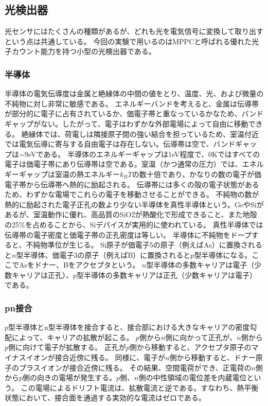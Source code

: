 \subsection{光検出器}
光センサにはたくさんの種類があるが、どれも光を電気信号に変換して取り出すという点は共通している。
今回の実験で用いるのはMPPCと呼ばれる優れた光子カウント能力を持つ小型の光検出器である。

\subsubsection{半導体}
半導体の電気伝導度は金属と絶縁体の中間の値をとり、温度、光、および微量の不純物に対し非常に敏感である。
エネルギーバンドを考えると、金属は伝導帯が部分的に電子に占有されているか、価電子帯と重なっているかなため、バンドギャップがない。したがって、電子はわずかな外部電場によって自由に移動できる。
絶縁体では、荷電しは隣接原子間の強い結合を担っているため、室温付近では電気伝導に寄与する自由電子は存在しない。伝導帯は空で、バンドギャップは$\sim9$eVである。
半導体のエネルギーギャップは1eV程度で、0Kではすべての電子は価電子帯にあり伝導帯は空である。室温（かつ通常の圧力）では、エネルギーギャップは室温の熱エネルギー$k_BT$の数十倍であり、かなりの数の電子が価電子帯から伝導帯へ熱的に励起される。
伝導帯には多くの殻の電子状態があるため、わずかな電場でこれらの電子を移動させることができる。
不純物の数が熱的に励起された電子正孔の数より少ない半導体を真性半導体という。GeやSiがあるが、室温動作に優れ、高品質のSiO2が熱酸化で形成できること、また地殻の25\%を占めることから、Siデバイスが実用的に使われている。
真性半導体では伝導帯の電子密度と価電子帯の正孔密度は等しい。
半導体に不純物をドープすると、不純物準位が生じる。
Si原子が価電子5の原子（例えばAs）に置換されると$n$型半導体、価電子3の原子（例えばB）に置換されると$p$型半導体になる。ここでAsをドナー、Bをアクセプタという。
$n$型半導体の多数キャリアは電子（少数キャリアは正孔）、$p$型半導体の多数キャリアは正孔（少数キャリアは電子）である。

\subsubsection{pn接合}
$p$型半導体とn型半導体を接合すると、接合部における大きなキャリアの密度勾配によって、キャリアの拡散が起こる。
$p$側から$n$側に向かって正孔が、$n$側から$p$側に向けて電子が拡散する。
正孔が$p$側から移動すると、アクセプタ原子のマイナスイオンが接合近傍に残る。
同様に、電子が$n$側から移動すると、ドナー原子のプラスイオンが接合近傍に残る。
その結果、空間電荷ができ、正電荷の$n$側から$p$側の向きの電場が発生する。$p$側、$n$側の中性領域の電位差を内蔵電位という。
この電場によるドリフト電流は、拡散電流と逆である。すなわち、熱平衡状態において、接合面を通過する実効的な電流はゼロである。

